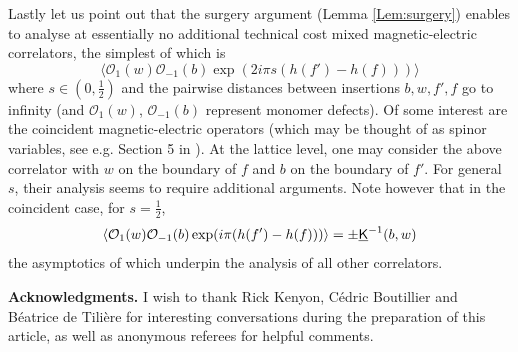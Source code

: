 \documentclass[10pt]{article}
\newcommand{\mc}{\mathcal}
\newcommand{\uK}{{\underline {\sf K}}}
\begin{document}
Lastly let us point out that the surgery argument (Lemma \ref{Lem:surgery}) enables to analyse at essentially no additional technical cost mixed magnetic-electric correlators, the simplest of which is
$$\langle{\mc O}_{1}(w){\mc O}_{-1}(b)\exp(2i\pi s(h(f')-h(f)))\rangle$$
where $s\in (0,\frac 12)$ and the pairwise distances between insertions $b,w,f',f$ go to infinity (and ${\mc O}_1(w)$, ${\mc O}_{-1}(b)$ represent monomer defects). Of some interest are the coincident magnetic-electric operators (which may be thought of as spinor variables, see e.g. Section 5 in \cite{Dub_abelian}). At the lattice level, one may consider the above correlator with $w$ on the boundary of $f$ and $b$ on the boundary of $f'$. For general $s$, their analysis seems to require additional arguments. Note however that in the coincident case, for $s=\frac 12$, 
$$\langle {\mc O}_{1}(w){\mc O}_{-1}(b)\exp(i\pi (h(f')-h(f)))\rangle=\pm \uK^{-1}(b,w)$$
the asymptotics of which underpin the analysis of all other correlators.



{\bf Acknowledgments.} I wish to thank Rick Kenyon, C\'edric Boutillier and B\'eatrice de Tili\`ere for interesting conversations during the preparation of this article, as well as anonymous referees for helpful comments.


\printglossary













%

%

%

%

%
%
%
%
%
%
%
%
%
%
%
%
%

%

%

%
%
%
%
%
%
%

%
%
%
%
%
%
%
%
%
%
%

%
%
%
%
%
%
%
%
%
%
%

%
%
%
%
%
%
%
%
%
%
%
%
%
%
%
%
%
%
%

%

%
%
%
%
%
%
%
%
%

%
%

%
%
%
%

%

%

%
%
%
%
%
%
%

%
%
\end{document}
